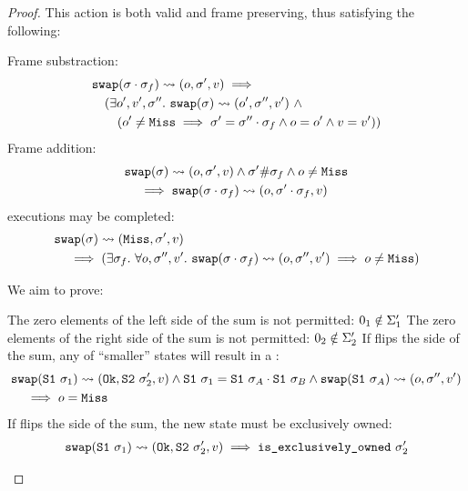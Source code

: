 \begin{proof}
This \swap{} action is both valid and frame preserving, thus satisfying the following:
\begin{hypvlist}
	 Frame substraction:
	\begin{align*}
		&\texttt{swap}(\sigma\cdot\sigma_f)\rightsquigarrow(o,\sigma',v)\implies\\
		&\quad(\exists o',v',\sigma''.~\texttt{swap}(\sigma)\rightsquigarrow(o',\sigma'',v')~\land\\
		&\qquad(o'\neq \texttt{Miss} \implies \sigma'=\sigma''\cdot\sigma_f\land o=o'\land v=v'))
	\end{align*}
	 Frame addition:
	\begin{align*}
		&\texttt{swap}(\sigma)\rightsquigarrow(o,\sigma',v)\land \sigma'\#\sigma_f\land o\neq\texttt{Miss}\\
		&\quad\implies \texttt{swap}(\sigma\cdot\sigma_f)\rightsquigarrow(o,\sigma'\cdot\sigma_f,v)
	\end{align*}
	 \Miss{} executions may be completed:
	\begin{align*}
		&\texttt{swap}(\sigma)\rightsquigarrow(\texttt{Miss},\sigma',v)\\
		&\quad\implies(\exists\sigma_f.~\forall o,\sigma'',v'.~\texttt{swap}(\sigma\cdot\sigma_f)\rightsquigarrow(o,\sigma'',v')\implies o\neq\texttt{Miss})
	\end{align*}

\end{hypvlist}
	
We aim to prove:
\begin{goalvlist}
     The zero elements of the left side of the sum is not permitted: $0_1\notin \Sigma_1'$ 
     The zero elements of the right side of the sum is not permitted: $0_2\notin \Sigma_2'$ 
     If \swap{} flips the side of the sum, any \swap{} of ``smaller'' states will result in a \Miss:
    \begin{align*}
    	&\texttt{swap}(\texttt{S1}~\sigma_1)\rightsquigarrow(\texttt{Ok},\texttt{S2}~\sigma_2',v)\land \texttt{S1}~\sigma_1 = \texttt{S1}~\sigma_A\cdot\texttt{S1}~\sigma_B \land \texttt{swap}(\texttt{S1}~\sigma_A)\rightsquigarrow(o,\sigma'',v') \\
    	&\quad\implies o = \texttt{Miss}
    \end{align*}
     If \swap{} flips the side of the sum, the new state must be exclusively owned:
    \begin{align*}
    	\texttt{swap}(\texttt{S1}~\sigma_1)\rightsquigarrow(\texttt{Ok},\texttt{S2}~\sigma_2',v) \implies \texttt{is\_exclusively\_owned}~\sigma_2'  
    \end{align*}
    
\end{goalvlist}




\end{proof}
